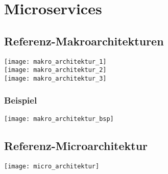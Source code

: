 
\section{Microservices}
\subsection{Referenz-Makroarchitekturen}
\texttt{[image: makro\_architektur\_1]}\\
\texttt{[image: makro\_architektur\_2]}\\
\texttt{[image: makro\_architektur\_3]}
\subsubsection{Beispiel}
\texttt{[image: makro\_architektur\_bsp]}
\subsection{Referenz-Microarchitektur}
\texttt{[image: micro\_architektur]}
